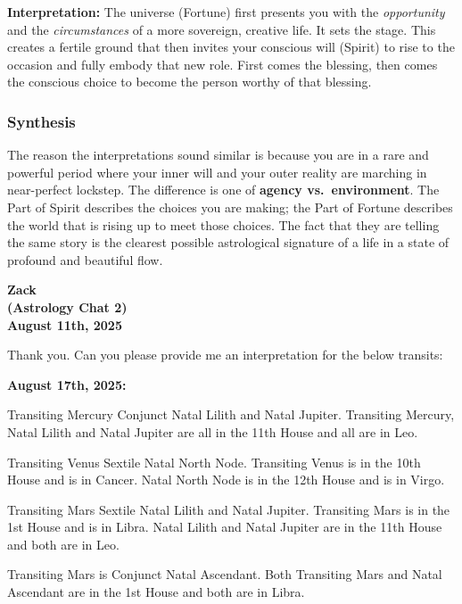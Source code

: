 \documentclass{article}
\begin{document}
\textbf{Interpretation:} The universe (Fortune) first presents you with the \emph{opportunity} and the \emph{circumstances} of a more sovereign, creative life. It sets the stage. This creates a fertile ground that then invites your conscious will (Spirit) to rise to the occasion and fully embody that new role. First comes the blessing, then comes the conscious choice to become the person worthy of that blessing.

\subsubsection*{Synthesis}\label{synthesis}

The reason the interpretations sound similar is because you are in a rare and powerful period where your inner will and your outer reality are marching in near-perfect lockstep. The difference is one of \textbf{agency vs.~environment}. The Part of Spirit describes the choices you are making; the Part of Fortune describes the world that is rising up to meet those choices. The fact that they are telling the same story is the clearest possible astrological signature of a life in a state of profound and beautiful flow.


\begin{center}
\textbf{Zack} \\
\textbf{(Astrology Chat 2)} \\
\textbf{August 11th, 2025} 
\end{center}

Thank you. Can you please provide me an interpretation for the below transits:

\textbf{August 17th, 2025:}

Transiting Mercury Conjunct Natal Lilith and Natal Jupiter. Transiting Mercury, Natal Lilith and Natal Jupiter are all in the 11th House and all are in Leo.

Transiting Venus Sextile Natal North Node. Transiting Venus is in the 10th House and is in Cancer. Natal North Node is in the 12th House and is in Virgo.

Transiting Mars Sextile Natal Lilith and Natal Jupiter. Transiting Mars is in the 1st House and is in Libra. Natal Lilith and Natal Jupiter are in the 11th House and both are in Leo.

Transiting Mars is Conjunct Natal Ascendant. Both Transiting Mars and Natal Ascendant are in the 1st House and both are in Libra.
\end{document}
